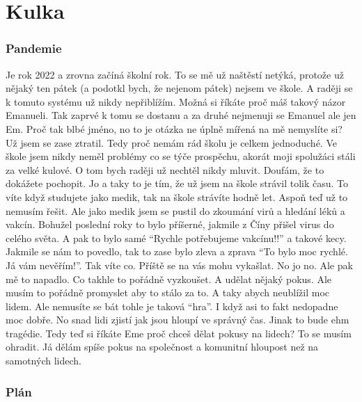 \part{Kulka}

\section{Pandemie}

Je rok 2022 a zrovna začíná školní rok. To se mě už naštěstí netýká, protože už nějaký ten pátek (a podotkl bych, že nejenom pátek) nejsem ve škole. A raději se k tomuto systému už nikdy nepřiblížím. Možná si říkáte proč máš takový názor Emanueli. Tak zaprvé k tomu se dostanu a za druhé nejmenuji se Emanuel ale jen Em. Proč tak blbé jméno, no to je otázka ne úplně mířená na mě nemyslíte si? Už jsem se zase ztratil. Tedy proč nemám rád školu je celkem jednoduché. Ve škole jsem nikdy neměl problémy co se týče prospěchu, akorát moji spolužáci stáli za velké kulové. O tom bych raději už nechtěl nikdy mluvit. Doufám, že to dokážete pochopit. Jo a taky to je tím, že už jsem na škole strávil tolik času. To víte když studujete jako medik, tak na škole strávíte hodně let. Aspoň teď už to nemusím řešit. Ale jako medik jsem se pustil do zkoumání virů a hledání léků a vakcín. Bohužel poslední roky to bylo příšerné, jakmile z Číny přišel virus do celého světa. A pak to bylo samé “Rychle potřebujeme vakcínu!!” a takové kecy. Jakmile se nám to povedlo, tak to zase bylo zleva a zprava “To bylo moc rychlé. Já vám nevěřím!”. Tak víte co. Příště se na vás mohu vykašlat. No jo no. Ale pak mě to napadlo. Co takhle to pořádně vyzkoušet. A udělat nějaký pokus. Ale musím to pořádně promyslet aby to stálo za to. A taky abych neublížil moc lidem. Ale nemusíte se bát tohle je taková “hra”. I když asi to fakt nedopadne moc dobře. No snad lidi zjistí jak jsou hloupí ve správný čas. Jinak to bude ehm tragédie. Tedy teď si říkáte Eme proč chceš dělat pokusy na lidech? To se musím ohradit. Já dělám spíše pokus na společnost a komunitní hloupost než na samotných lidech.

\section{Plán}

